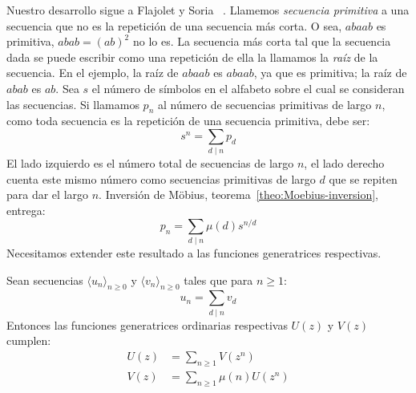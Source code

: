   Nuestro desarrollo sigue a Flajolet y Soria~%
    \cite{flajolet91:_cycle_constr}.
  Llamemos \emph{secuencia primitiva} a una secuencia
  que no es la repetición de una secuencia más corta.%
  O sea,
  \(a b a a b\) es primitiva,
  \(a b a b = (a b)^2\) no lo es.
  La secuencia más corta
  tal que la secuencia dada
  se puede escribir como una repetición de ella
  la llamamos la \emph{raíz} de la secuencia.%
  En el ejemplo,
  la raíz de \(a b a a b\) es \(a b a a b\),
  ya que es primitiva;
  la raíz de \(a b a b\) es \(a b\).
  Sea \(s\) el número de símbolos en el alfabeto
  sobre el cual se consideran las secuencias.
  Si llamamos \(p_n\)
  al número de secuencias primitivas de largo \(n\),
  como toda secuencia es la repetición de una secuencia primitiva,
  debe ser:
  \begin{equation*}
    s^n
      = \sum_{d \mid n} p_d
  \end{equation*}
  El lado izquierdo es el número total de secuencias de largo \(n\),
  el lado derecho cuenta este mismo número
  como secuencias primitivas de largo \(d\)
  que se repiten para dar el largo \(n\).
  Inversión de Möbius,
  teorema~\ref{theo:Moebius-inversion},
  entrega:
  \begin{equation*}
    p_n
      = \sum_{d \mid n} \mu(d) s^{n / d}
  \end{equation*}
  Necesitamos extender este resultado
  a las funciones generatrices respectivas.
  \begin{lemma}
    \label{lem:GF-Moebius-inversion}
    Sean secuencias \(\langle u_n \rangle_{n \ge 0}\)
    y \(\langle v_n \rangle_{n \ge 0}\)
    tales que para \(n \ge 1\):
    \begin{equation*}
      u_n
	= \sum_{d \mid n} v_d
    \end{equation*}
    Entonces las funciones generatrices ordinarias
    respectivas \(U(z)\) y \(V(z)\)
    cumplen:
    \begin{align*}
      U(z)
	&= \sum_{n \ge 1} V(z^n) \\
      V(z)
	&= \sum_{n \ge 1} \mu(n) U(z^n)
    \end{align*}
  \end{lemma}
